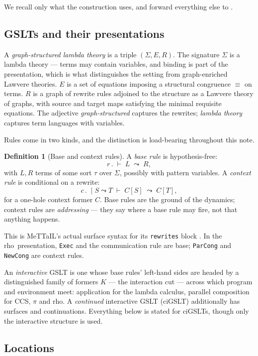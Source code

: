 \documentclass[11pt,a4paper]{article}
\theoremstyle{plain}
\theoremstyle{definition}
\newtheorem{definition}[theorem]{Definition}
\theoremstyle{remark}
\newcommand{\rhoc}{\textsf{rho}}
\begin{document}
We recall only what the construction uses, and forward everything else to \cite{omnibus}.

\subsection{GSLTs and their presentations}

A \emph{graph-structured lambda theory} is a triple $(\Sigma, E, R)$. The signature $\Sigma$ is a
lambda theory --- terms may contain variables, and binding is part of the presentation, which is
what distinguishes the setting from graph-enriched Lawvere theories. $E$ is a set of equations
imposing a structural congruence $\equiv$ on terms. $R$ is a graph of rewrite rules adjoined to the
structure as a Lawvere theory of graphs, with source and target maps satisfying the minimal
requisite equations. The adjective \emph{graph-structured} captures the rewrites; \emph{lambda
theory} captures term languages with variables.

Rules come in two kinds, and the distinction is load-bearing throughout this note.

\begin{definition}[Base and context rules]
\label{def:rules}
A \emph{base rule} is hypothesis-free:
\[
r \,.\; \vdash\; L \;\leadsto\; R,
\]
with $L, R$ terms of some sort $\tau$ over $\Sigma$, possibly with pattern variables. A
\emph{context rule} is conditional on a rewrite:
\[
c \,.\; \mid S \leadsto T \;\vdash\; C[S] \;\leadsto\; C[T],
\]
for a one-hole context former $C$. Base rules are the ground of the dynamics; context rules are
\emph{addressing} --- they say where a base rule may fire, not that anything happens.
\end{definition}

This is MeTTaIL's actual surface syntax for its \texttt{rewrites} block \cite{mettail}. In the
\rhoc\ presentation, \texttt{Exec} and the communication rule are base; \texttt{ParCong} and
\texttt{NewCong} are context rules.

An \emph{interactive} GSLT is one whose base rules' left-hand sides are headed by a distinguished
family of formers $K$ --- the interaction cut --- across which program and environment meet:
application for the lambda calculus, parallel composition for CCS, $\pi$ and \rhoc. A
\emph{continued} interactive GSLT (ciGSLT) additionally has surfaces and continuations. Everything
below is stated for ciGSLTs, though only the interactive structure is used.

\subsection{Locations}
\end{document}
